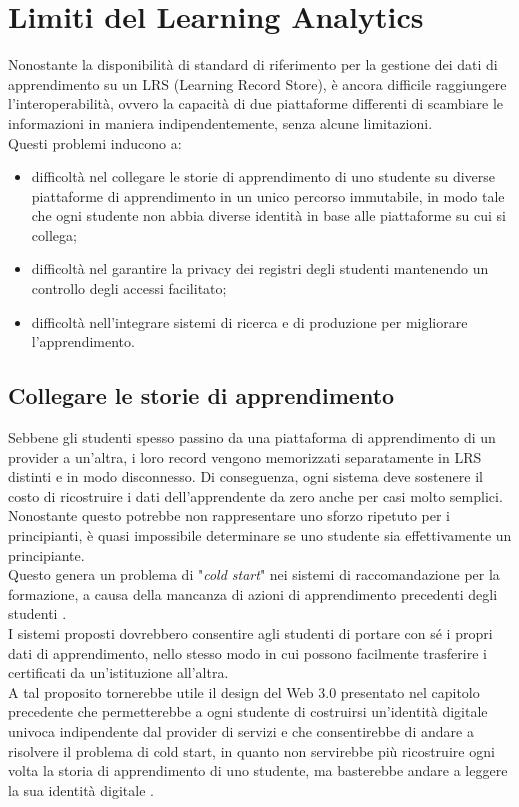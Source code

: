 \section{Limiti del Learning Analytics}
Nonostante la disponibilità di standard di riferimento per la gestione dei dati di apprendimento su un LRS (Learning Record Store), è ancora difficile raggiungere l'interoperabilità,
ovvero la capacità di due piattaforme differenti di scambiare le informazioni in maniera indipendentemente, senza alcune limitazioni.
\\Questi problemi inducono a:
\begin{itemize}
    \item difficoltà nel collegare le storie di apprendimento di uno studente su diverse piattaforme di apprendimento in un unico percorso immutabile, in modo tale che ogni studente non abbia diverse identità in base alle piattaforme su cui si collega;
    \item difficoltà nel garantire la privacy dei registri degli studenti mantenendo un controllo degli accessi facilitato;
    \item difficoltà nell'integrare sistemi di ricerca e di produzione per migliorare l'apprendimento.
\end{itemize}

\subsection{Collegare le storie di apprendimento }
Sebbene gli studenti spesso passino da una piattaforma di apprendimento di un provider a un'altra, i loro record vengono memorizzati separatamente in LRS distinti e in modo disconnesso. 
Di conseguenza, ogni sistema deve sostenere il costo di ricostruire i dati dell'apprendente da zero anche per casi molto semplici. Nonostante questo potrebbe non rappresentare uno sforzo ripetuto per i principianti, è quasi impossibile determinare se uno studente sia effettivamente un principiante.
\\Questo genera un problema di "\textit{cold start}" nei sistemi di raccomandazione per la formazione, a causa della mancanza di azioni di apprendimento precedenti degli studenti \cite{barnes_stamper_2008}.
\\I sistemi proposti dovrebbero consentire agli studenti di portare con sé i propri dati di apprendimento,
nello stesso modo in cui possono facilmente trasferire i certificati da un'istituzione all'altra. 
\\A tal proposito tornerebbe utile il design del Web 3.0 presentato nel capitolo precedente che permetterebbe a ogni studente di costruirsi un'identità digitale univoca indipendente dal provider di servizi e che consentirebbe di
andare a risolvere il problema di cold start, in quanto non servirebbe più ricostruire ogni volta la storia di apprendimento di uno studente, ma basterebbe andare a leggere la sua identità digitale \cite{ocheja2018connecting}.

